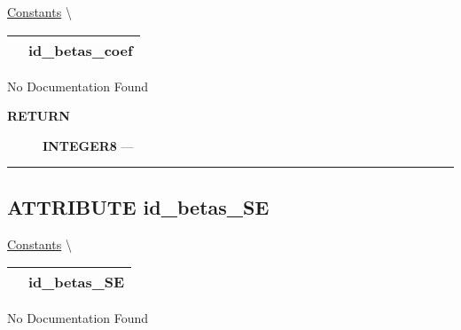 \hypertarget{ecldoc:logisticregression.constants.id_betas_coef}{}
\hspace{0pt} \hyperlink{ecldoc:LogisticRegression.Constants}{Constants} \textbackslash 

{\renewcommand{\arraystretch}{1.5}
\begin{tabularx}{\textwidth}{|>{\raggedright\arraybackslash}l|X|}
\hline
\hspace{0pt}\mytexttt{\color{red} } & \textbf{id\_betas\_coef} \\
\hline
\end{tabularx}
}

\par





No Documentation Found








\par
\begin{description}
\item [\colorbox{tagtype}{\color{white} \textbf{\textsf{RETURN}}}] \textbf{INTEGER8} --- 
\end{description}




\rule{\linewidth}{0.5pt}
\subsection*{\textsf{\colorbox{headtoc}{\color{white} ATTRIBUTE}
id\_betas\_SE}}

\hypertarget{ecldoc:logisticregression.constants.id_betas_se}{}
\hspace{0pt} \hyperlink{ecldoc:LogisticRegression.Constants}{Constants} \textbackslash 

{\renewcommand{\arraystretch}{1.5}
\begin{tabularx}{\textwidth}{|>{\raggedright\arraybackslash}l|X|}
\hline
\hspace{0pt}\mytexttt{\color{red} } & \textbf{id\_betas\_SE} \\
\hline
\end{tabularx}
}

\par





No Documentation Found








